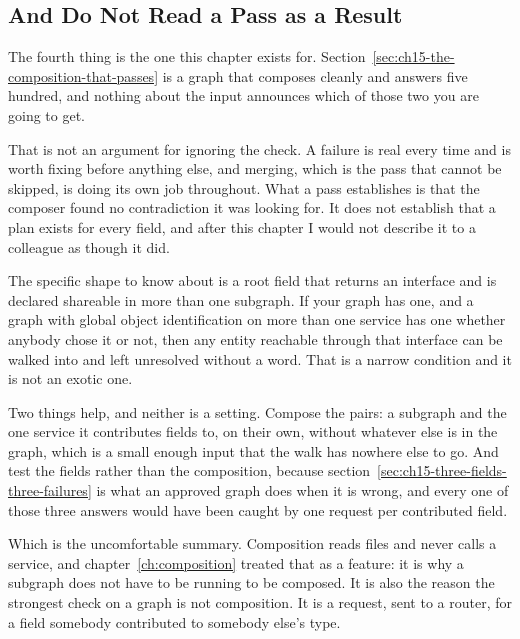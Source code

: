 \subsection{And Do Not Read a Pass as a Result}

%
The fourth thing is the one this chapter exists for.
Section~\ref{sec:ch15-the-composition-that-passes} is a graph that composes
cleanly and answers five hundred, and nothing about the input announces which
of those two you are going to get.

%
That is not an argument for ignoring the check. A failure is real every time
and is worth fixing before anything else, and merging, which is the pass that
cannot be skipped, is doing its own job throughout. What a pass establishes is
that the composer found no contradiction it was looking for. It does not
establish that a plan exists for every field, and after this chapter I would
not describe it to a colleague as though it did.

%
The specific shape to know about is a root field that returns an interface and
is declared shareable in more than one subgraph. If your graph has one, and a
graph with global object identification on more than one service has one
whether anybody chose it or not, then any entity reachable through that
interface can be walked into and left unresolved without a word. That is a
narrow condition and it is not an exotic one.

%
Two things help, and neither is a setting. Compose the pairs: a subgraph and
the one service it contributes fields to, on their own, without whatever else
is in the graph, which is a small enough input that the walk has nowhere else
to go. And test the fields rather than the composition, because
section~\ref{sec:ch15-three-fields-three-failures} is what an approved graph
does when it is wrong, and every one of those three answers would have been
caught by one request per contributed field.

%
Which is the uncomfortable summary. Composition reads files and never calls a
service, and chapter~\ref{ch:composition} treated that as a feature: it is why
a subgraph does not have to be running to be composed. It is also the reason
the strongest check on a graph is not composition. It is a request, sent to a
router, for a field somebody contributed to somebody else's type.
